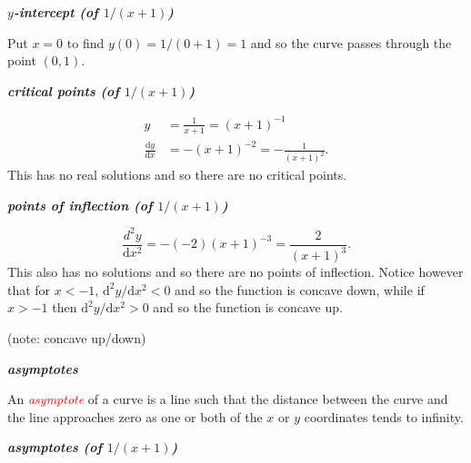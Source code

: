 \documentclass[
  11pt,
  oneside]{book}
\newcommand{\slide}{}
\theoremstyle{definition}
\theoremstyle{definition}
\theoremstyle{definition}
\theoremstyle{definition}
\theoremstyle{remark}
\begin{document}
\textbf{\emph{\(y\)-intercept (of \(1/(x+1)\))}}

\begin{notslides}

Put \(x=0\) to find \(y(0) = 1/(0+1) = 1\) and so the curve passes through the point \((0,1)\).

\end{notslides}

\slide

\textbf{\emph{critical points (of \(1/(x+1)\))}}

\begin{notslides}

\begin{align*}
y&=\frac1{x+1} = (x+1)^{-1}\\
\frac{\mathrm{d} y}{\mathrm{d} x} &= -(x+1)^{-2} = -\frac1{(x+1)^2}.
\end{align*}
This has no real solutions and so there are no critical points.

\end{notslides}

\slide

\textbf{\emph{points of inflection (of \(1/(x+1)\))}}

\begin{notslides}

\[
\frac{d^2y}{\mathrm{d} x^2} = -(-2)(x+1)^{-3} = \frac2{(x+1)^3}.
\]
This also has no solutions and so there are no points of inflection. Notice however that for \(x < -1\), \(\mathrm{d}^2y/\mathrm{d} x^2<0\) and so the function is concave down, while if \(x>-1\) then \(\mathrm{d}^2y/\mathrm{d} x^2 >0\) and so the function is concave up.

\end{notslides}

\begin{slidesonly}

\vfill (note: concave up/down)

\end{slidesonly}

\slide

\textbf{\emph{asymptotes}}

An \textcolor{red}{\em asymptote} of a curve is a line such that the distance between the curve and the line approaches zero as one or both of the \(x\) or \(y\) coordinates tends to infinity.

\slide

\textbf{\emph{asymptotes (of \(1/(x+1)\))}}
\end{document}

